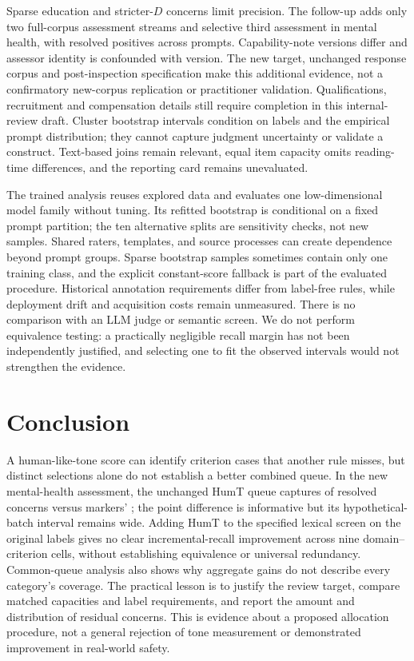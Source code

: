 \documentclass[manuscript,screen,review,anonymous]{acmart}
\begin{document}
Sparse education and stricter-$D$ concerns limit precision. The follow-up adds only two full-corpus assessment streams and selective third assessment in mental health, with \IAPositive{} resolved positives across \IAClusters{} prompts. Capability-note versions differ and assessor identity is confounded with version. The new target, unchanged response corpus and post-inspection specification make this additional evidence, not a confirmatory new-corpus replication or practitioner validation. Qualifications, recruitment and compensation details still require completion in this internal-review draft. Cluster bootstrap intervals condition on labels and the empirical prompt distribution; they cannot capture judgment uncertainty or validate a construct. Text-based joins remain relevant, equal item capacity omits reading-time differences, and the reporting card remains unevaluated.

The trained analysis reuses explored data and evaluates one low-dimensional model family without tuning. Its refitted bootstrap is conditional on a fixed prompt partition; the ten alternative splits are sensitivity checks, not new samples. Shared raters, templates, and source processes can create dependence beyond prompt groups. Sparse bootstrap samples sometimes contain only one training class, and the explicit constant-score fallback is part of the evaluated procedure. Historical annotation requirements differ from label-free rules, while deployment drift and acquisition costs remain unmeasured. There is no comparison with an LLM judge or semantic screen. We do not perform equivalence testing: a practically negligible recall margin has not been independently justified, and selecting one to fit the observed intervals would not strengthen the evidence.

\section{Conclusion}
A human-like-tone score can identify criterion cases that another rule misses, but distinct selections alone do not establish a better combined queue. In the new mental-health assessment, the unchanged HumT queue captures \IAHCaught{} of \IAPositive{} resolved concerns versus markers' \IAMCaught{}; the point difference is informative but its hypothetical-batch interval remains wide. Adding HumT to the specified lexical screen on the original labels gives no clear incremental-recall improvement across nine domain--criterion cells, without establishing equivalence or universal redundancy. Common-queue analysis also shows why aggregate gains do not describe every category's coverage. The practical lesson is to justify the review target, compare matched capacities and label requirements, and report the amount and distribution of residual concerns. This is evidence about a proposed allocation procedure, not a general rejection of tone measurement or demonstrated improvement in real-world safety.
\end{document}
